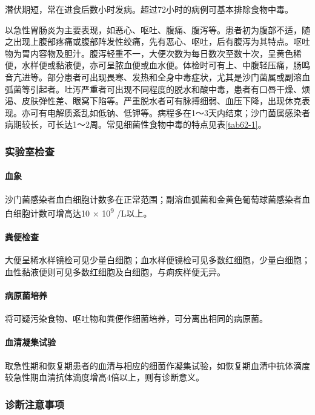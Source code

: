 潜伏期短，常在进食后数小时发病。超过72小时的病例可基本排除食物中毒。

以急性胃肠炎为主要表现，如恶心、呕吐、腹痛、腹泻等。患者初为腹部不适，随之出现上腹部疼痛或腹部阵发性绞痛，先有恶心、呕吐，后有腹泻为其特点。呕吐物为胃内容物及胆汁。腹泻轻重不一，大便次数为每日数次至数十次，呈黄色稀便，水样便或黏液便，亦可呈脓血便或血水便。体检时可有上、中腹轻压痛，肠鸣音亢进等。部分患者可出现畏寒、发热和全身中毒症状，尤其是沙门菌属或副溶血弧菌等引起者。吐泻严重者可出现不同程度的脱水和酸中毒，患者有口唇干燥、烦渴、皮肤弹性差、眼窝下陷等。严重脱水者可有脉搏细弱、血压下降，出现休克表现。亦可有电解质紊乱如低钠、低钾等。病程多在1～3天内结束；沙门菌属感染者病期较长，可长达1～2周。常见细菌性食物中毒的特点见表\ref{tab62-1}。

\subsubsection{实验室检查}

\paragraph{血象}

沙门菌感染者血白细胞计数多在正常范围；副溶血弧菌和金黄色葡萄球菌感染者血白细胞计数可增高达10
× 10\textsuperscript{9} /L以上。

\paragraph{粪便检查}

大便呈稀水样镜检可见少量白细胞；血水样便镜检可见多数红细胞，少量白细胞；血性黏液便则可见多数红细胞及白细胞，与痢疾样便无异。

\paragraph{病原菌培养}

将可疑污染食物、呕吐物和粪便作细菌培养，可分离出相同的病原菌。

\paragraph{血清凝集试验}

取急性期和恢复期患者的血清与相应的细菌作凝集试验，如恢复期血清中抗体滴度较急性期血清抗体滴度增高4倍以上，则有诊断意义。

\subsubsection{诊断注意事项}

